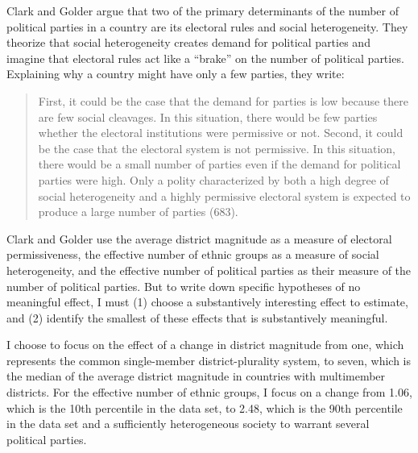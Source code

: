 \documentclass[12pt]{article}
\begin{document}
Clark and Golder argue that two of the primary determinants of the number of political parties in a country are its electoral rules and social heterogeneity. They theorize that social heterogeneity creates demand for political parties and imagine that electoral rules act like a ``brake'' on the number of political parties. Explaining why a country might have only a few parties, they write: 
\begin{quote}
First, it could be the case that the demand for parties is low because there are few social cleavages. In this situation, there would be few parties whether the electoral institutions were permissive or not. Second, it could be the case that the electoral system is not permissive. In this situation, there would be a small number of parties even if the demand for political parties were high. Only a polity characterized by both a high degree of social heterogeneity and a highly permissive electoral system is expected to produce a large number of parties (683).
\end{quote}

\noindent Clark and Golder use the average district magnitude as a measure of electoral permissiveness, the effective number of ethnic groups as a measure of social heterogeneity, and the effective number of political parties as their measure of the number of political parties. But to write down specific hypotheses of no meaningful effect, I must (1) choose a substantively interesting effect to estimate, and (2) identify the smallest of these effects that is substantively meaningful. 

I choose to focus on the effect of a change in district magnitude from one, which represents the common single-member district-plurality system, to seven, which is the median of the average district magnitude in countries with multimember districts. For the effective number of ethnic groups, I focus on a change from 1.06, which is the 10th percentile in the data set, to 2.48, which is the 90th percentile in the data set and a sufficiently heterogeneous society to warrant several political parties. 
\end{document}
